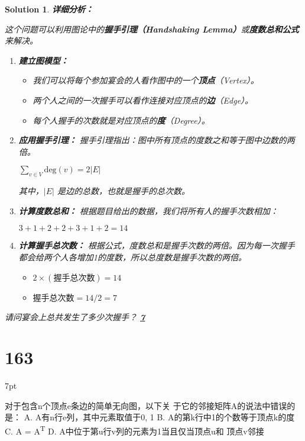 \documentclass[UTF8]{report}
\newtheorem{solution}{Solution}
\theoremstyle{MyLineTheoremStyle} %
\theoremstyle{MyBlockTheoremStyle} %
\theoremstyle{MySubsubsectionStyle} %
\newenvironment{graybox}{%
        \def\FrameCommand{%
        \hspace{1pt}%
        {\color{gray}\small \vrule width 2pt}%
        {\color{graybox_color}\vrule width 4pt}%
        \colorbox{graybox_color}%
        }%
        \MakeFramed{\advance\hsize-\width\FrameRestore}%
        \noindent\hspace{-4.55pt}%
        \begin{adjustwidth}{}{7pt}%
        \vspace{2pt}\vspace{2pt}%
        }
        {%
        \vspace{2pt}\end{adjustwidth}\endMakeFramed%
        }
\begin{document}
\begin{solution}
\textbf{详细分析：}

这个问题可以利用图论中的\textbf{握手引理（Handshaking Lemma）}或\textbf{度数总和公式}来解决。

\begin{enumerate}
    \item \textbf{建立图模型：}
    \begin{itemize}
        \item 我们可以将每个参加宴会的人看作图中的一个\textbf{顶点}（Vertex）。
        \item 两个人之间的一次握手可以看作连接对应顶点的\textbf{边}（Edge）。
        \item 每个人握手的次数就是对应顶点的\textbf{度}（Degree）。
    \end{itemize}

    \item \textbf{应用握手引理：}
    握手引理指出：图中所有顶点的度数之和等于图中边数的两倍。
    \begin{center}
    $\sum_{v \in V} \text{deg}(v) = 2|E|$
    \end{center}
    其中，$|E|$ 是边的总数，也就是握手的总次数。

    \item \textbf{计算度数总和：}
    根据题目给出的数据，我们将所有人的握手次数相加：
    \begin{center}
    $3 + 1 + 2 + 2 + 3 + 1 + 2 = 14$
    \end{center}

    \item \textbf{计算握手总次数：}
    根据公式，度数总和是握手次数的两倍。因为每一次握手都会给两个人各增加1的度数，所以总度数是握手次数的两倍。
    \begin{itemize}
        \item $2 \times (\text{握手总次数}) = 14$
        \item $\text{握手总次数} = 14 / 2 = 7$
    \end{itemize}
\end{enumerate}

\hrulefill

请问宴会上总共发生了多少次握手？
\underline{\hspace{2cm}\textbf{7}\hspace{2cm}}
\end{solution}

\section*{163}
\begin{graybox}
对于包含n个顶点e条边的简单无向图，以下关
于它的邻接矩阵A的说法中错误的是：
A. A有n行e列，其中元素取值于{0, 1}
B. A的第k行中1的个数等于顶点k的度
C. A = A\textsuperscript{T}
D. A中位于第u行v列的元素为1当且仅当顶点u和
顶点v邻接
\end{graybox}
\end{document}
